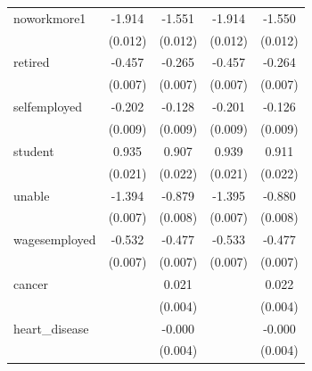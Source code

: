 \documentclass[11pt,a4paper,oldfontcommands]{memoir}
\begin{document}
{\begin{footnotesize}
\begin{footnotesize}
\begin{longtable}{l*{4}{c}}
noworkmore1         &      -1.914\sym{***}&      -1.551\sym{***}&      -1.914\sym{***}&      -1.550\sym{***}\\
                    &     (0.012)         &     (0.012)         &     (0.012)         &     (0.012)         \\
 
retired             &      -0.457\sym{***}&      -0.265\sym{***}&      -0.457\sym{***}&      -0.264\sym{***}\\
                    &     (0.007)         &     (0.007)         &     (0.007)         &     (0.007)         \\
 
selfemployed        &      -0.202\sym{***}&      -0.128\sym{***}&      -0.201\sym{***}&      -0.126\sym{***}\\
                    &     (0.009)         &     (0.009)         &     (0.009)         &     (0.009)         \\
 
student             &       0.935\sym{***}&       0.907\sym{***}&       0.939\sym{***}&       0.911\sym{***}\\
                    &     (0.021)         &     (0.022)         &     (0.021)         &     (0.022)         \\
 
unable              &      -1.394\sym{***}&      -0.879\sym{***}&      -1.395\sym{***}&      -0.880\sym{***}\\
                    &     (0.007)         &     (0.008)         &     (0.007)         &     (0.008)         \\
 
wagesemployed       &      -0.532\sym{***}&      -0.477\sym{***}&      -0.533\sym{***}&      -0.477\sym{***}\\
                    &     (0.007)         &     (0.007)         &     (0.007)         &     (0.007)         \\
cancer              &                     &       0.021\sym{***}&                     &       0.022\sym{***}\\
                    &                     &     (0.004)         &                     &     (0.004)         \\
 
heart\_disease       &                     &      -0.000         &                     &      -0.000         \\
                    &                     &     (0.004)         &                     &     (0.004)         \\
 

\end{longtable}
\end{footnotesize}
\end{footnotesize}}
\end{document}

